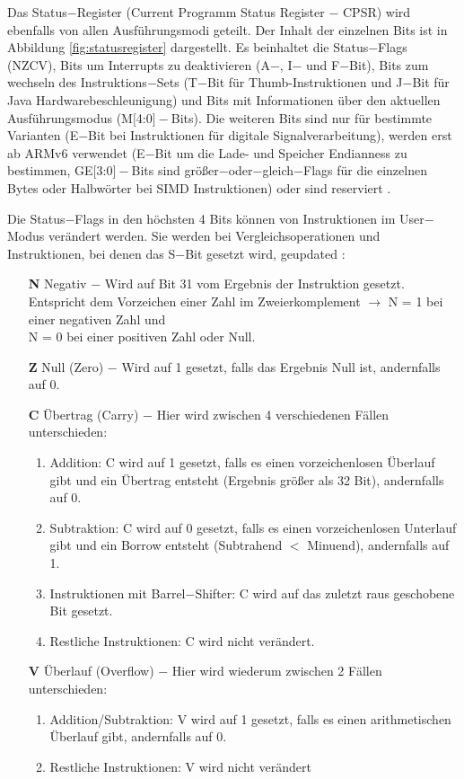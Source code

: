 \documentclass[a4paper, 11pt, onecolumn]{article}
\begin{document}
Das Status$-$Register (Current Programm Status Register $-$ CPSR) wird ebenfalls von allen Ausführungsmodi geteilt. Der Inhalt der einzelnen Bits ist in Abbildung \ref{fig:statusregister} dargestellt. Es beinhaltet die Status$-$Flags (NZCV), Bits um Interrupts zu deaktivieren (A$-$, I$-$ und F$-$Bit), Bits zum wechseln des Instruktions$-$Sets (T$-$Bit für Thumb-Instruktionen und J$-$Bit für Java Hardwarebeschleunigung) und Bits mit Informationen über den aktuellen Ausführungsmodus (M$[$4:0$]-$Bits). Die weiteren Bits sind nur für bestimmte Varianten (E$-$Bit bei Instruktionen für digitale Signalverarbeitung), werden erst ab ARMv6 verwendet (E$-$Bit um die Lade- und Speicher Endianness zu bestimmen, GE$[$3:0$]-$Bits sind größer$-$oder$-$gleich$-$Flags für die einzelnen Bytes oder Halbwörter bei SIMD Instruktionen) oder sind reserviert \cite{arm:2005}.

Die Status$-$Flags in den höchsten 4 Bits können von Instruktionen im User$-$Modus verändert werden. Sie werden bei Vergleichsoperationen und Instruktionen, bei denen das S$-$Bit gesetzt wird, geupdated \cite{arm:2005}:


\begin{itemize}[labelindent=1.5em,labelsep=0.5cm,leftmargin=*]
\item[\textbf{N}] Negativ $-$ Wird auf Bit 31 vom Ergebnis der Instruktion gesetzt. Entspricht dem Vorzeichen einer Zahl im Zweierkomplement $\rightarrow$ N = 1 bei einer negativen Zahl und\\N = 0 bei einer positiven Zahl oder Null.
\item[\textbf{Z}] Null (Zero) $-$ Wird auf 1 gesetzt, falls das Ergebnis Null ist, andernfalls auf 0.
\item[\textbf{C}] Übertrag (Carry) $-$ Hier wird zwischen 4 verschiedenen Fällen unterschieden:
\begin{enumerate}[labelindent=0em,labelsep=0.5cm,leftmargin=*]
\item Addition: C wird auf 1 gesetzt, falls es einen vorzeichenlosen Überlauf gibt und ein Übertrag entsteht (Ergebnis größer als 32 Bit), andernfalls auf 0.
\item Subtraktion: C wird auf 0 gesetzt, falls es einen vorzeichenlosen Unterlauf gibt und ein Borrow entsteht (Subtrahend $<$ Minuend), andernfalls auf 1.
\item Instruktionen mit Barrel$-$Shifter: C wird auf das zuletzt raus geschobene Bit gesetzt.
\item Restliche Instruktionen: C wird nicht verändert.
\end{enumerate}
\item[\textbf{V}] Überlauf (Overflow) $-$ Hier wird wiederum zwischen 2 Fällen unterschieden:
\begin{enumerate}[labelindent=0em,labelsep=0.5cm,leftmargin=*]
\item Addition/Subtraktion: V wird auf 1 gesetzt, falls es einen arithmetischen Überlauf gibt, andernfalls auf 0.
\item Restliche Instruktionen: V wird nicht verändert
\end{enumerate}
\end{itemize}
\end{document}
